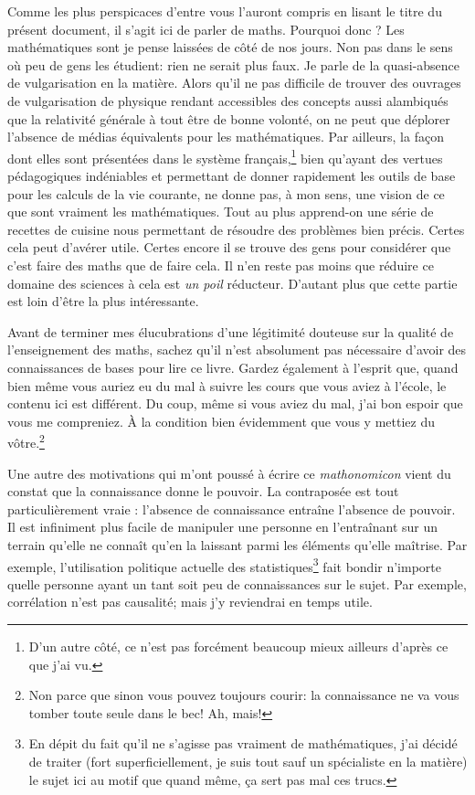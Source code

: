 
Comme les plus perspicaces d'entre vous l'auront compris en lisant le
titre du présent document, il s'agit ici de parler de maths. Pourquoi
donc ? Les mathématiques sont je pense laissées de côté de nos
jours. Non pas dans le sens où peu de gens les étudient: rien ne
serait plus faux. Je parle de la quasi-absence de vulgarisation en la
matière. Alors qu'il ne pas difficile de trouver des ouvrages de
vulgarisation de physique rendant accessibles des concepts aussi
alambiqués que la relativité générale à tout être de bonne volonté, on
ne peut que déplorer l'absence de médias équivalents pour les
mathématiques. Par ailleurs, la façon dont elles sont présentées dans
le système français,\footnote{D'un autre côté, ce n'est pas forcément
  beaucoup mieux ailleurs d'après ce que j'ai vu.} bien qu'ayant des
vertues pédagogiques indéniables et permettant de donner rapidement
les outils de base pour les calculs de la vie courante, ne donne pas,
à mon sens, une vision de ce que sont vraiment les mathématiques. Tout
au plus apprend-on une série de recettes de cuisine nous permettant de
résoudre des problèmes bien précis. Certes cela peut d'avérer
utile. Certes encore il se trouve des gens pour considérer que c'est
faire des maths que de faire cela. Il n'en reste pas moins que réduire
ce domaine des sciences à cela est \emph{un poil} réducteur. D'autant
plus que cette partie est loin d'être la plus intéressante.

Avant de terminer mes élucubrations d'une légitimité douteuse sur la
qualité de l'enseignement des maths, sachez qu'il n'est absolument pas
nécessaire d'avoir des connaissances de bases pour lire ce
livre. Gardez également à l'esprit que, quand bien même vous auriez eu
du mal à suivre les cours que vous aviez à l'école, le contenu ici est
différent. Du coup, même si vous aviez du mal, j'ai bon espoir que
vous me compreniez. À la condition bien évidemment que vous y mettiez
du vôtre.\footnote{Non parce que sinon vous pouvez toujours courir: la
  connaissance ne va vous tomber toute seule dans le bec! Ah, mais!}


Une autre des motivations qui m'ont poussé à écrire ce
\emph{mathonomicon} vient du constat que la connaissance donne le
pouvoir. La contraposée est tout particulièrement vraie : l'absence de
connaissance entraîne l'absence de pouvoir. Il est infiniment plus
facile de manipuler une personne en l'entraînant sur un terrain
qu'elle ne connaît qu'en la laissant parmi les éléments qu'elle
maîtrise. Par exemple, l'utilisation politique actuelle des
statistiques\footnote{En dépit du fait qu'il ne s'agisse pas vraiment
  de mathématiques, j'ai décidé de traiter (fort superficiellement, je
  suis tout sauf un spécialiste en la matière) le sujet ici au motif
  que quand même, ça sert pas mal ces trucs.} fait bondir n'importe
quelle personne ayant un tant soit peu de connaissances sur le
sujet. Par exemple, corrélation n'est pas causalité; mais j'y
reviendrai en temps utile.


